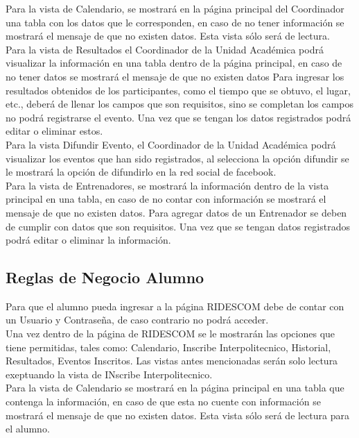 	\noindent Para la vista de Calendario, se mostrará en la página principal del Coordinador una tabla con los datos que le corresponden, en caso de no tener información se mostrará el mensaje de que no existen datos. Esta vista sólo será de lectura.\\
	
	\noindent Para la vista de Resultados el Coordinador de la Unidad Académica podrá visualizar la información en una tabla dentro de la página principal, en caso de no tener datos se mostrará el mensaje de que no existen datos Para ingresar los resultados obtenidos de los participantes, como el tiempo que se obtuvo, el lugar, etc., deberá de llenar los campos que son requisitos, sino se completan los campos no podrá registrarse el evento. Una vez que se tengan los datos registrados podrá editar o eliminar estos.\\
	
	\noindent Para la vista Difundir Evento, el Coordinador de la Unidad Académica podrá visualizar los eventos que han sido registrados, al selecciona la opción difundir se le mostrará la opción de difundirlo en la red social de facebook.\\
	
	\noindent Para la vista de Entrenadores, se mostrará la información dentro de la vista principal en una tabla, en caso de no contar con información se mostrará el mensaje de que no existen datos. Para agregar datos de un Entrenador se deben de cumplir con datos que son requisitos. Una vez que se tengan datos registrados podrá editar o eliminar la información. \\
	
	\subsection{Reglas de Negocio Alumno}
	Para que el alumno pueda ingresar a la página RIDESCOM debe de contar con un Usuario y Contraseña, de caso contrario no podrá acceder.\\
	
	Una vez dentro de la página de RIDESCOM se le mostrarán las opciones que tiene permitidas, tales como: Calendario, Inscribe Interpolitecnico, Historial,  Resultados, Eventos Inscritos. Las vistas antes mencionadas serán solo lectura exeptuando la vista de INscribe Interpolitecnico.\\
	
	Para la vista de Calendario se mostrará en la página principal en una tabla que contenga la información, en caso de que esta no cuente con información se mostrará el mensaje de que no existen datos. Esta vista sólo será de lectura para el alumno.\\
	
